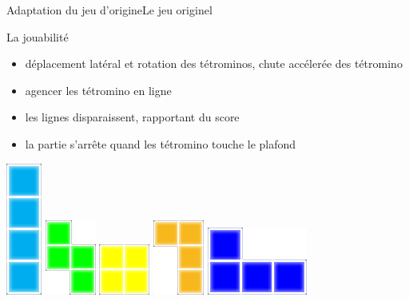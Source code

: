 \documentclass[french]{beamer}
\begin{document}
\begin{frame}{Adaptation du jeu d'origine}{Le jeu originel}
	\begin{block}{La jouabilité}
		\begin{itemize}
			\item déplacement latéral et rotation des tétrominos, chute accélerée des tétromino
			\item agencer les tétromino en ligne
			\item les lignes disparaissent, rapportant du score
			\item la partie s'arrête quand les tétromino touche le plafond
		\end{itemize}

	\end{block}

	\begin{center}
		\includegraphics[scale=0.3]{img/1.png}
		\includegraphics[scale=0.4]{img/2.png}
		\includegraphics[scale=0.4]{img/3.png}
		\includegraphics[scale=0.4]{img/4.png}
		\includegraphics[scale=0.3]{img/5.png}

\end{center}
\end{frame}
\end{document}
